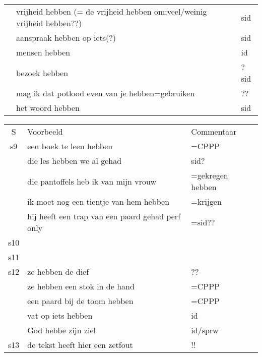 \begin{tabular}[t]{|c|p{}|p{}|}
   & vrijheid hebben (= de vrijheid hebben om;veel/weinig
     vrijheid hebben??)                                      & sid\\
   & aanspraak hebben op iets(?)                             & sid\\
   & mensen hebben                                           & id\\
   & bezoek hebben                                           & ?sid\\
   & mag ik dat potlood even van je hebben=gebruiken         & ??\\
   & het woord hebben                                        & sid\\
\hline
\end{tabular}
\begin{tabular}[t]{|c|p{}|p{}|}
\hline
S  &  Voorbeeld                                              & Commentaar\\
s9 & een boek te leen hebben                                 & =CPPP\\
   & die les hebben we al gehad                              & sid?\\
   & die pantoffels heb ik van mijn vrouw                    & =gekregen hebben\\
   & ik moet nog een tientje van hem hebben                  & =krijgen\\
   & hij heeft een trap van een paard gehad     perf only    & =sid??\\
s10 &                                                        & \\
s11 &                                                        &\\
s12 & ze hebben de dief                                      & ??\\
    & ze hebben een stok in de hand                          & =CPPP\\
    & een paard bij de toom hebben                           & =CPPP\\
    & vat op iets hebben                                     & id\\
    & God hebbe zijn ziel                                    & id/sprw\\
s13 & de tekst heeft hier een zetfout                        & !!\\
\hline
\end{tabular}

